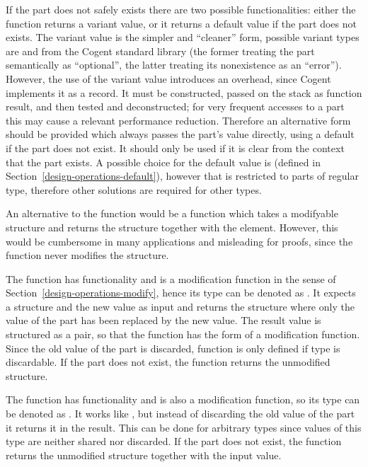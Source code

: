 If the part does not safely exists there are two possible functionalities: either the function returns a variant
value, or it returns a default value if the part does not exists. The variant value is the simpler and ``cleaner''
form, possible variant types are  and  from the Cogent standard library (the former treating
the part semantically as ``optional'', the latter treating its nonexistence as an ``error''). However, the use
of the variant value introduces an overhead, since Cogent implements it as a record. It must be constructed, passed
on the stack as function result, and then tested and deconstructed; for very frequent accesses to a part this may
cause a relevant performance reduction. Therefore an alternative form should be provided which always passes the
part's value directly, using a default if the part does not exist. It should only be used if it is clear from the
context that the part exists. A possible choice for the default value is  (defined in 
Section~\ref{design-operations-default}), however that is restricted to parts of regular type, therefore other 
solutions are required for other types.

An alternative to the function  would be a function which takes a modifyable structure and returns the structure
together with the element. However, this would be cumbersome in many applications and misleading for proofs, since 
the function never modifies the structure. 

The function  has functionality  and is a modification function in the sense of 
Section~\ref{design-operations-modify}, hence its type can be denoted as . 
It expects a structure and the new value as input
and returns the structure where only the value of the part has been replaced by the new value. The result value is 
structured as a pair, so that the function has the form of a modification function. Since the old
value of the part is discarded, function  is only defined if type  is discardable.
If the part does not exist, the function returns the unmodified structure.

The function  has functionality  and is also a modification function, so its type
can be denoted as . It works like , but instead of
discarding the old value of the part it returns it in the result. This can be done for arbitrary types 
since values of this type are neither shared nor discarded. If the part does not exist, the function returns
the unmodified structure together with the input value.

